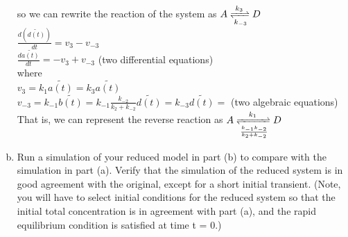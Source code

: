 \documentclass[paper=a4, fontsize=11pt]{scrartcl} %
\numberwithin{equation}{section} %
\numberwithin{figure}{section} %
\numberwithin{table}{section} %
\begin{document}
\begin{enumerate}[a)]
		so we can rewrite the reaction of the system as $A \xrightleftharpoons[k_{-3}]{k_{3}} D$\\
		$\frac{d(\tilde{d(t)})}{dt}=v_{3}-v_{-3}$\\
		$\frac{d\tilde{a(t)}}{dt}=-v_{3}+v_{-3}$ (two differential equations)\\
		where\\
		$v_{3}=k_1\tilde{a(t)}=k_3\tilde{a(t)}$\\
		$v_{-3}=k_{-1}\tilde{b(t)}=k_{-1}\frac{k_{-2}}{k_2+k_{-2}}\tilde{d(t)}=k_{-3}\tilde{d(t)}=$
		(two algebraic equations)\\
		That is, we can represent the reverse reaction as $A \xrightleftharpoons[\frac{k_{-1}k_{-2}}{k_2+k_{-2}}]{k_{1}} D$

		\item Run a simulation of your reduced model in part (b) to compare with the simulation in part (a). Verify that the simulation of the reduced system is in good agreement with the original, except for a short initial transient. (Note, you will have to select initial conditions for the reduced system so that the initial total concentration is in agreement with part (a), and the rapid equilibrium condition is satisfied at time t = 0.)
	\end{enumerate}
\end{document}
